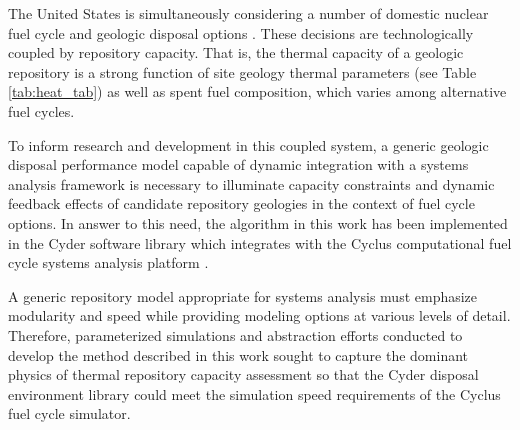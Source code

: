 
The United States is simultaneously considering a number of domestic nuclear 
fuel cycle and geologic disposal options \cite{doe_strategy_2013}.  These decisions are technologically 
coupled by repository capacity. That is, the thermal capacity of a geologic 
repository is a strong function of site geology thermal parameters (see Table 
\ref{tab:heat_tab}) as well as spent fuel composition, which varies among 
alternative fuel cycles. 

To inform research and development in this coupled system, a generic geologic disposal 
performance model capable of dynamic integration with a systems analysis 
framework is necessary to illuminate capacity constraints and dynamic feedback 
effects of candidate repository geologies in the context of fuel cycle options.
In answer to this need, the algorithm in this work has been implemented in the 
Cyder software library which integrates with the Cyclus computational 
fuel cycle systems analysis platform \cite{huff_cyder_2013,wilson_cyclus:_2012}. 



A generic repository model appropriate for systems analysis must emphasize 
modularity and speed while providing modeling options at various levels of 
detail. Therefore, parameterized simulations and abstraction efforts conducted to develop 
the method described in this work sought to capture the dominant physics of 
thermal repository capacity assessment so that the Cyder disposal environment 
library could meet the simulation speed requirements of the Cyclus fuel cycle 
simulator.

